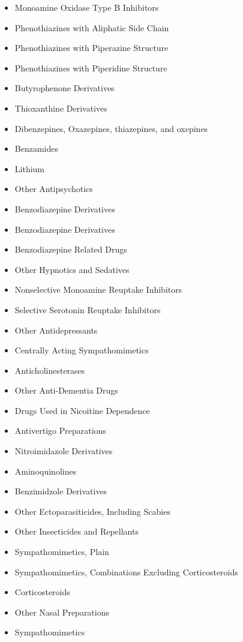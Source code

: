 \documentclass[a4paper,12pt]{article}
\begin{document}
\begin{appendices}
\begin{itemize}
   			\item Monoamine Oxidase Type B Inhibitors
   			\item Phenothiazines with Aliphatic Side Chain
   			\item Phenothiazines with Piperazine Structure
   			\item Phenothiazines with Piperidine Structure
   			\item Butyrophenone Derivatives
   			\item Thioxanthine Derivatives
   			\item Dibenzepines, Oxazepines, thiazepines, and oxepines
   			\item Benzamides
   			\item Lithium
   			\item Other Antipsychotics
   			\item Benzodiazepine Derivatives
   			\item Benzodiazepine Derivatives
   			\item Benzodiazepine Related Drugs
   			\item Other Hypnotics and Sedatives
   			\item Nonselective Monoamine Reuptake Inhibitors
   			\item Selective Serotonin Reuptake Inhibitors
   			\item Other Antidepressants
   			\item Centrally Acting Sympathomimetics
   			\item Anticholinesterases
   			\item Other Anti-Dementia Drugs
   			\item Drugs Used in Nicoitine Dependence
   			\item Antivertigo Preparations
   			\item Nitroimidazole Derivatives
   			\item Aminoquinolines
   			\item Benzimidzole Derivatives
   			\item Other Ectoparasiticides, Including Scabies
   			\item Other Insecticides and Repellants
   			\item Sympathomimetics, Plain
   			\item Sympathomimetics, Combinations Excluding Corticosteroids
   			\item Corticosteroids
   			\item Other Nasal Preparations
   			\item Sympathomimetics

\end{itemize}
\end{appendices}
\end{document}
